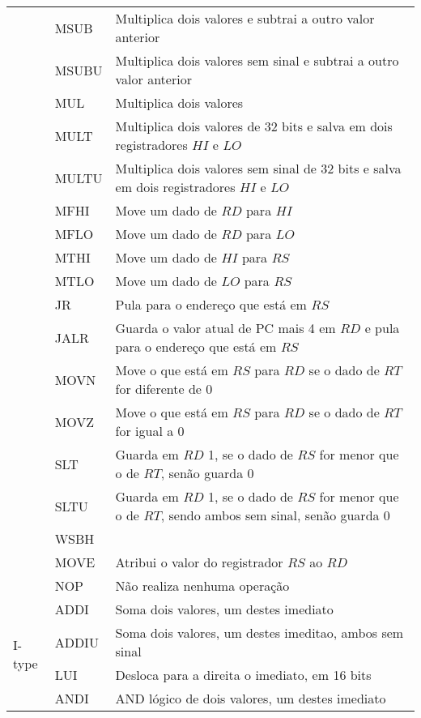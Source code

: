 \begin{center}
\begin{longtable}[pos]{|m{2cm} | m{1cm} | m{8cm}|}
			& MSUB &  Multiplica dois valores e subtrai a outro valor anterior\\ \cline{2-3}
			& MSUBU & Multiplica dois valores sem sinal e subtrai a outro valor anterior \\ \cline{2-3}
			& MUL & Multiplica dois valores  \\ \cline{2-3}
			& MULT & Multiplica dois valores de 32 bits e salva em dois registradores $HI$ e $LO$ \\ \cline{2-3}
			& MULTU & Multiplica dois valores sem sinal de 32 bits e salva em dois registradores $HI$ e $LO$ \\ \cline{2-3}
			& MFHI & Move um dado de $RD$ para $HI$ \\ \cline{2-3}
			& MFLO & Move um dado de $RD$ para $LO$ \\ \cline{2-3}
			& MTHI & Move um dado de $HI$ para $RS$ \\ \cline{2-3}
			& MTLO & Move um dado de $LO$ para $RS$ \\ \cline{2-3}
			& JR & Pula para o endereço que está em $RS$ \\ \cline{2-3}
			& JALR & Guarda o valor atual de PC mais 4 em $RD$ e pula para o endereço que está em $RS$ \\ \cline{2-3}
			& MOVN & Move o que está em $RS$ para $RD$ se o dado de $RT$ for diferente de 0  \\ \cline{2-3}
			& MOVZ & Move o que está em $RS$ para $RD$ se o dado de $RT$ for igual a 0  \\ \cline{2-3}
			& SLT & Guarda em $RD$ 1, se o dado de $RS$ for menor que o de $RT$, senão guarda 0 \\ \cline{2-3}
			& SLTU & Guarda em $RD$ 1, se o dado de $RS$ for menor que o de $RT$, sendo ambos sem sinal, senão guarda 0 \\ \cline{2-3}
			& WSBH &  \\ \cline{2-3}
			& MOVE & Atribui o valor do registrador $RS$ ao $RD$ \\\hline
			& NOP & Não realiza nenhuma operação \\\hline
	\multirow{20}{*}{I-type} & ADDI & Soma dois valores, um destes imediato \\ \cline{2-3}
	& ADDIU & Soma dois valores, um destes imeditao, ambos sem sinal \\ \cline{2-3}
	& LUI & Desloca para a direita o imediato, em 16 bits \\ \cline{2-3}
	& ANDI & AND lógico de dois valores, um destes imediato \\ \cline{2-3}

\end{longtable}
\end{center}
